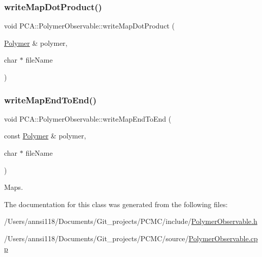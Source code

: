 \hypertarget{class_p_c_a_1_1_polymer_observable_aa41850ca819c76bdceeb644e0a570c46}{}\label{class_p_c_a_1_1_polymer_observable_aa41850ca819c76bdceeb644e0a570c46} 
\subsubsection{\texorpdfstring{write\+Map\+Dot\+Product()}{writeMapDotProduct()}}
{\footnotesize\ttfamily void P\+C\+A\+::\+Polymer\+Observable\+::write\+Map\+Dot\+Product (\begin{DoxyParamCaption}\item[{\hyperlink{class_p_c_a_1_1_polymer}{Polymer} \&}]{polymer,  }\item[{char $\ast$}]{file\+Name }\end{DoxyParamCaption})\hspace{0.3cm}{\ttfamily [static]}}

\hypertarget{class_p_c_a_1_1_polymer_observable_ac63e1b37da93eca84e21916f01279a59}{}\label{class_p_c_a_1_1_polymer_observable_ac63e1b37da93eca84e21916f01279a59} 
\subsubsection{\texorpdfstring{write\+Map\+End\+To\+End()}{writeMapEndToEnd()}}
{\footnotesize\ttfamily void P\+C\+A\+::\+Polymer\+Observable\+::write\+Map\+End\+To\+End (\begin{DoxyParamCaption}\item[{const \hyperlink{class_p_c_a_1_1_polymer}{Polymer} \&}]{polymer,  }\item[{char $\ast$}]{file\+Name }\end{DoxyParamCaption})\hspace{0.3cm}{\ttfamily [static]}}



Maps. 



The documentation for this class was generated from the following files\+:\begin{DoxyCompactItemize}
\item 
/\+Users/annsi118/\+Documents/\+Git\+\_\+projects/\+P\+C\+M\+C/include/\hyperlink{_polymer_observable_8h}{Polymer\+Observable.\+h}\item 
/\+Users/annsi118/\+Documents/\+Git\+\_\+projects/\+P\+C\+M\+C/source/\hyperlink{_polymer_observable_8cpp}{Polymer\+Observable.\+cpp}\end{DoxyCompactItemize}

